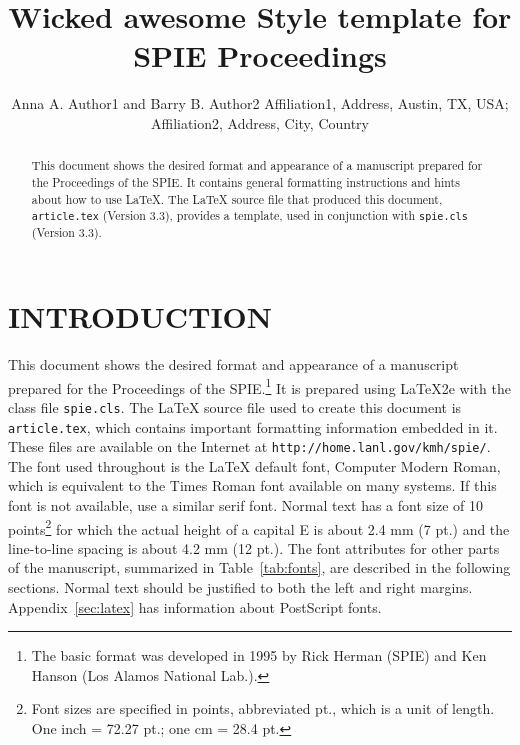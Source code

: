 \documentclass[]{spie}  %
\title{Wicked awesome Style template for SPIE Proceedings}
\author{Anna A. Author1\supit{a} and Barry B. Author2\supit{b}
\skiplinehalf
\supit{a}Affiliation1, Address, Austin, TX, USA; \\
\supit{b}Affiliation2, Address, City, Country
}
\begin{document}
 
  \maketitle 

\begin{abstract}
This document shows the desired format and appearance of a manuscript prepared for the Proceedings of the SPIE.  It contains general formatting instructions and hints about how to use LaTeX.  The LaTeX source file that produced this document, {\tt article.tex} (Version 3.3), provides a template, used in conjunction with {\tt spie.cls} (Version 3.3).  
\end{abstract}



\section{INTRODUCTION}
\label{sec:intro}  %

This document shows the desired format and appearance of a manuscript prepared for the Proceedings of the SPIE.\footnote{The basic format was developed in 1995 by Rick Herman (SPIE) and Ken Hanson (Los Alamos National Lab.).} It is prepared using LaTeX2e\cite{Lamport94} with the class file {\tt spie.cls}.  The LaTeX source file used to create this document is {\tt article.tex}, which contains important formatting information embedded in it.  These files are available on the Internet at {\tt http://home.lanl.gov/kmh/spie/}.  The font used throughout is the LaTeX default font, Computer Modern Roman, which is equivalent to the Times Roman font available on many systems.  If this font is not available, use a similar serif font.  Normal text has a font size of 10 points\footnote{Font sizes are specified in points, abbreviated pt., which is a unit of length.  One inch = 72.27 pt.; one cm = 28.4 pt.} for which the actual height of a capital E is about 2.4 mm (7 pt.) and the line-to-line spacing is about 4.2 mm (12 pt.).  The font attributes for other parts of the manuscript, summarized in Table~\ref{tab:fonts}, are described in the following sections.  Normal text should be justified to both the left and right margins.  Appendix~\ref{sec:latex} has information about PostScript fonts.
\end{document}
